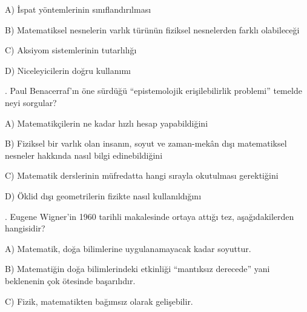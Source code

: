 \par\noindent\hspace*{1.6em}A) İspat yöntemlerinin sınıflandırılması

\par\noindent\hspace*{1.6em}B) Matematiksel nesnelerin varlık türünün fiziksel nesnelerden farklı olabileceği

\par\noindent\hspace*{1.6em}C) Aksiyom sistemlerinin tutarlılığı

\par\noindent\hspace*{1.6em}D) Niceleyicilerin doğru kullanımı

\par\smallskip{}. Paul Benacerraf’ın öne sürdüğü “epistemolojik erişilebilirlik problemi” temelde neyi sorgular?

\par\noindent\hspace*{1.6em}A) Matematikçilerin ne kadar hızlı hesap yapabildiğini

\par\noindent\hspace*{1.6em}B) Fiziksel bir varlık olan insanın, soyut ve zaman-mekân dışı matematiksel nesneler hakkında nasıl bilgi edinebildiğini

\par\noindent\hspace*{1.6em}C) Matematik derslerinin müfredatta hangi sırayla okutulması gerektiğini

\par\noindent\hspace*{1.6em}D) Öklid dışı geometrilerin fizikte nasıl kullanıldığını

\par\smallskip{}. Eugene Wigner’in 1960 tarihli makalesinde ortaya attığı tez, aşağıdakilerden hangisidir?

\par\noindent\hspace*{1.6em}A) Matematik, doğa bilimlerine uygulanamayacak kadar soyuttur.

\par\noindent\hspace*{1.6em}B) Matematiğin doğa bilimlerindeki etkinliği “mantıksız derecede” yani beklenenin çok ötesinde başarılıdır.

\par\noindent\hspace*{1.6em}C) Fizik, matematikten bağımsız olarak gelişebilir.

